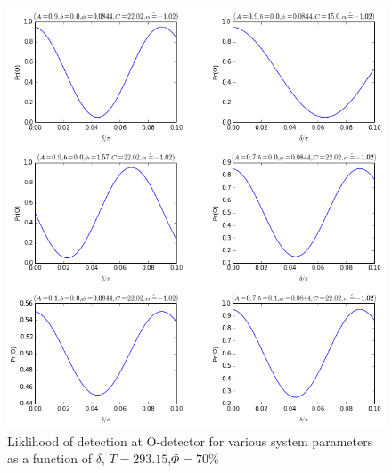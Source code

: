 \begin{figure}[ht!]
\centering
\includegraphics[scale=0.7]{Figures/likelihoods.png}
\caption{Liklihood of detection at O-detector for various system parameters as a function of $\delta$, $T=293.15$,$\Phi=70\%$}
\label{fig:liklihoods}
\end{figure}

